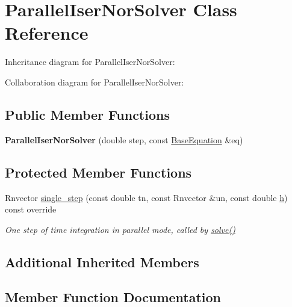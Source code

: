 \hypertarget{classParallelIserNorSolver}{}\section{Parallel\+Iser\+Nor\+Solver Class Reference}
\label{classParallelIserNorSolver}


Inheritance diagram for Parallel\+Iser\+Nor\+Solver\+:


Collaboration diagram for Parallel\+Iser\+Nor\+Solver\+:
\subsection*{Public Member Functions}
\begin{DoxyCompactItemize}
\item 
\mbox{\label{classParallelIserNorSolver_a5316d47db330753f44ed088250857ec0}} 
{\bfseries Parallel\+Iser\+Nor\+Solver} (double step, const \hyperlink{classBaseEquation}{Base\+Equation} \&eq)
\end{DoxyCompactItemize}
\subsection*{Protected Member Functions}
\begin{DoxyCompactItemize}
\item 
Rnvector \hyperlink{classParallelIserNorSolver_a10cac84b730cf473723461622f1a74e0}{single\+\_\+step} (const double tn, const Rnvector \&un, const double \hyperlink{classBaseSolver_a6dbedd1610b0979379e6acbb0a4093cd}{h}) const override
\begin{DoxyCompactList}\small\item\em One step of time integration in parallel mode, called by \hyperlink{classRKSolver_aa251eaaa56b4ef39d95347579b8a6259}{solve()} \end{DoxyCompactList}\end{DoxyCompactItemize}
\subsection*{Additional Inherited Members}


\subsection{Member Function Documentation}
\mbox{\label{classParallelIserNorSolver_a10cac84b730cf473723461622f1a74e0}} 
